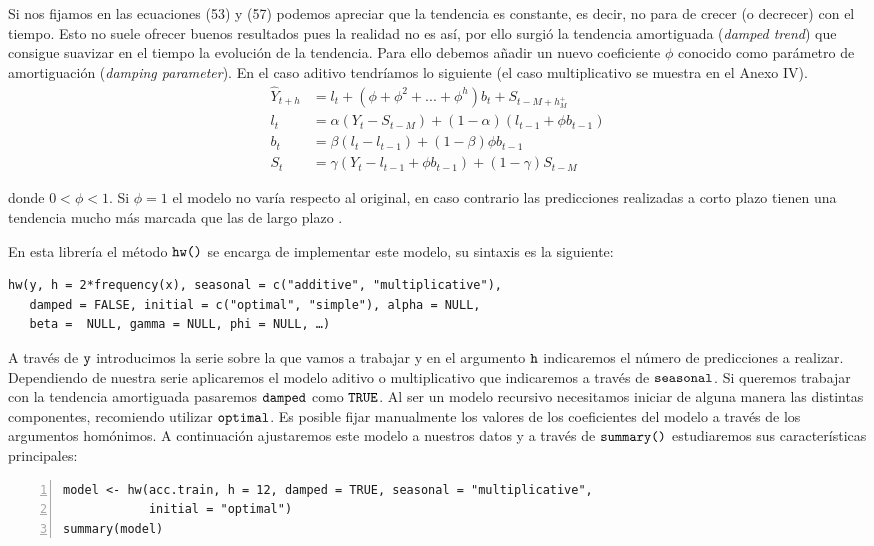 Si nos fijamos en las ecuaciones (53) y (57) podemos apreciar que la tendencia es constante, es decir, no para de crecer (o decrecer) con el tiempo. Esto no suele ofrecer buenos resultados pues la realidad no es así, por ello surgió la tendencia amortiguada (\textit{damped trend}) que consigue suavizar en el tiempo la evolución de la tendencia. Para ello debemos añadir un nuevo coeficiente $\phi$ conocido como parámetro de amortiguación (\textit{damping parameter}). En el caso aditivo tendríamos lo siguiente (el caso multiplicativo se muestra en el Anexo IV).
\begin{align}
  \widehat{Y}_{t+h} &= l_t + (\phi + \phi^2 + ... + \phi^h)b_t + S_{t - M + h^+_M} \\
  l_t &= \alpha(Y_t - S_{t - M}) + (1 -\alpha)(l_{t-1}+ \phi b_{t-1}) \\
  b_t &= \beta(l_t - l_{t-1}) + (1 -\beta) \phi b_{t-1} \\
  S_t &= \gamma(Y_t - l_{t-1} + \phi b_{t-1}) + (1 - \gamma) S_{t-M}
\end{align}

\noindent donde $0 < \phi < 1$. Si $\phi = 1$ el modelo no varía respecto al original, en caso contrario las predicciones realizadas a corto plazo tienen una tendencia mucho más marcada que las de largo plazo \cite{hyndman2014forecasting}.

En esta librería el método $\verb!hw()!$ se encarga de implementar este modelo, su sintaxis es la siguiente:
\begin{Verbatim}[fontsize=\footnotesize]
hw(y, h = 2*frequency(x), seasonal = c("additive", "multiplicative"),
   damped = FALSE, initial = c("optimal", "simple"), alpha = NULL,
   beta =  NULL, gamma = NULL, phi = NULL, …)
\end{Verbatim}

A través de $\verb!y!$ introducimos la serie sobre la que vamos a trabajar y en el argumento $\verb!h!$ indicaremos el número de predicciones a realizar. Dependiendo de nuestra serie aplicaremos el modelo aditivo o multiplicativo que indicaremos a través de $\verb!seasonal!$. Si queremos trabajar con la tendencia amortiguada pasaremos $\verb!damped!$ como $\verb!TRUE!$. Al ser un modelo recursivo necesitamos iniciar de alguna manera las distintas componentes, recomiendo utilizar $\verb!optimal!$. Es posible fijar manualmente los valores de los coeficientes del modelo a través de los argumentos homónimos. A continuación ajustaremos este modelo a nuestros datos y a través de $\verb!summary()!$ estudiaremos sus características principales:
\begin{Verbatim}[fontsize=\footnotesize, numbers = left]
model <- hw(acc.train, h = 12, damped = TRUE, seasonal = "multiplicative",
            initial = "optimal")
summary(model)
\end{Verbatim}

